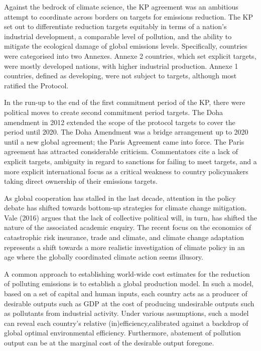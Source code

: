 \documentclass[
  letterpaper,
  DIV=11,
  numbers=noendperiod]{scrartcl}
\begin{document}
Against the bedrock of climate science, the KP agreement was an
ambitious attempt to coordinate across borders on targets for emissions
reduction. The KP set out to differentiate reduction targets equitably
in terms of a nation's industrial development, a comparable level of
pollution, and the ability to mitigate the ecological damage of global
emissions levels. Specifically, countries were categorised into two
Annexes. Annexe 2 countries, which set explicit targets, were mostly
developed nations, with higher industrial production. Annexe 1
countries, defined as developing, were not subject to targets, although
most ratified the Protocol.

In the run-up to the end of the first commitment period of the KP, there
were political moves to create second commitment period targets. The
Doha amendment in 2012 extended the scope of the protocol targets to
cover the period until 2020. The Doha Amendment was a bridge arrangement
up to 2020 until a new global agreement; the Paris Agreement came into
force. The Paris agreement has attracted considerable criticism.
Commentators cite a lack of explicit targets, ambiguity in regard to
sanctions for failing to meet targets, and a more explicit international
focus as a critical weakness to country policymakers taking direct
ownership of their emissions targets.

As global cooperation has stalled in the last decade, attention in the
policy debate has shifted towards bottom-up strategies for climate
change mitigation. Vale (2016) argues that the lack of collective
political will, in turn, has shifted the nature of the associated
academic enquiry. The recent focus on the economics of catastrophic risk
insurance, trade and climate, and climate change adaptation represents a
shift towards a more realistic investigation of climate policy in an age
where the globally coordinated climate action seems illusory.

A common approach to establishing world-wide cost estimates for the
reduction of polluting emissions is to establish a global production
model. In such a model, based on a set of capital and human inputs, each
country acts as a producer of desirable outputs such as GDP at the cost
of producing undesirable outputs such as pollutants from industrial
activity. Under various assumptions, such a model can reveal each
country's relative (in)efficiency,calibrated against a backdrop of
global optimal environmental efficiency. Furthermore, abatement of
pollution output can be at the marginal cost of the desirable output
foregone.
\end{document}
